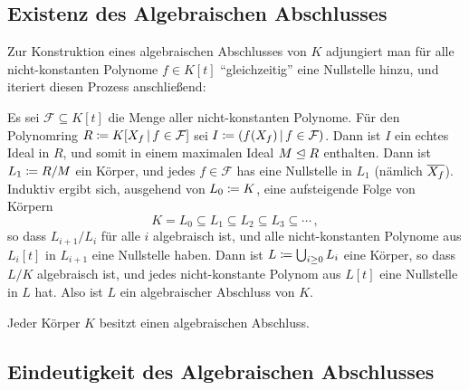\subsection{Existenz des Algebraischen Abschlusses}

Zur Konstruktion eines algebraischen Abschlusses von $K$ adjungiert man für alle nicht-konstanten Polynome $f \in K[t]$ \enquote{gleichzeitig} eine Nullstelle hinzu, und iteriert diesen Prozess anschließend:

Es sei $\mathcal{F} \subseteq K[t]$ die Menge aller nicht-konstanten Polynome.
Für den Polynomring $R \defined K[X_f \suchthat f \in \mathcal{F}]$ sei $I \defined \genideal{f(X_f) \suchthat f \in \mathcal{F}}$.
Dann ist $I$ ein echtes Ideal in $R$, und somit in einem maximalen Ideal $M \mathrel{\trianglelefteq} R$ enthalten.
Dann ist $L_1 \coloneqq R/M$ ein Körper, und jedes $f \in \mathcal{F}$ has eine Nullstelle in $L_1$ (nämlich $\overline{X_f}$).
Induktiv ergibt sich, ausgehend von $L_0 \coloneqq K$, eine aufsteigende Folge von Körpern
\[
            K
  =         L_0
  \subseteq L_1
  \subseteq L_2
  \subseteq L_3
  \subseteq \dotsb \,,
\]
so dass $L_{i+1}/L_i$ für alle $i$ algebraisch ist, und alle nicht-konstanten Polynome aus $L_i[t]$ in $L_{i+1}$ eine Nullstelle haben.
Dann ist $L \coloneqq \bigcup_{i \geq 0} L_i$ eine Körper, so dass $L/K$ algebraisch ist, und jedes nicht-konstante Polynom aus $L[t]$ eine Nullstelle in $L$ hat.
Also ist $L$ ein algebraischer Abschluss von $K$.

\begin{theorem}
  Jeder Körper $K$ besitzt einen algebraischen Abschluss.
\end{theorem}



\subsection{Eindeutigkeit des Algebraischen Abschlusses}

